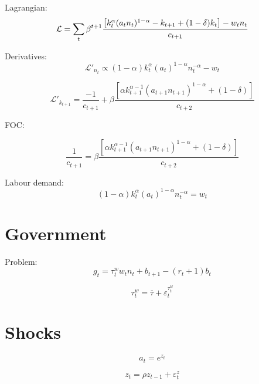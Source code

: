 \documentclass[12pt]{extreport}
\begin{document}
	Lagrangian:
		\begin{equation}
		\mathcal{L} =  \sum_t \beta^{t+1} \frac{   \left[ k_t^{\alpha} (a_t n_t)^{1-\alpha} - k_{t+1} + (1-\delta) k_t \right] - w_t n_t }{c_{t+1}   } \\
		\end{equation}

	Derivatives:
		\begin{equation}
		\mathcal{L}'_{n_t} \propto  \left(1-\alpha \right)    k_t^{\alpha} (a_t )^{1-\alpha} n_t^{-\alpha} - w_t
		\end{equation}
		
		\begin{equation}
		\mathcal{L}'_{k_{t+1}} = \frac{ - 1 }{c_{t+1}   } + \beta
		\frac{    \left[ \alpha k_{t+1}^{\alpha-1} (a_{t+1} n_{t+1})^{1-\alpha}  + (1-\delta) \right]}{c_{t+2}  }
		\end{equation}

	FOC:

		
		\begin{equation}
		\frac{1  }{c_{t+1}   } = \beta
		\frac{    \left[ \alpha k_{t+1}^{\alpha-1} (a_{t+1} n_{t+1})^{1-\alpha}  + (1-\delta) \right]}{c_{t+2}  }
		\end{equation}
		
		
		Labour demand:
		\begin{equation}
		 \left(1-\alpha \right)    k_t^{\alpha} (a_t )^{1-\alpha} n_t^{-\alpha} = w_t
		\end{equation}


\section{Government}
	Problem:
	\begin{equation}
		g_t = \tau^w_t w_t n_t + b_{t+1} - (r_t +1)b_t
	\end{equation}
	
	\begin{equation}
	\tau^w_t = \overline{\tau} + \varepsilon_t^{\tau^w_t}
	\end{equation}

\section{Shocks}
	\begin{equation}
	a_t = e^{z_t}
	\end{equation}
	
	\begin{equation}
	z_t = \rho z_{t-1} + \varepsilon^z_t
	\end{equation}
\end{document}
